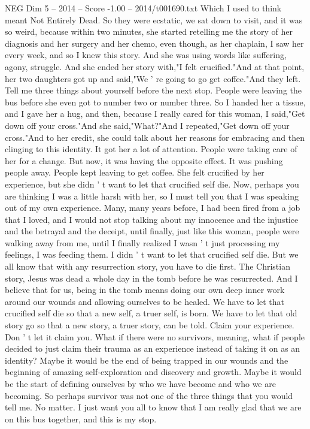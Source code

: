 \begin{textsample}{NEG Dim 5 – 2014 – Score -1.00 – 2014/t001690.txt}
Which I used to think meant Not Entirely Dead.
So they were ecstatic, we sat down to visit, and it was so weird, because within two minutes, she started retelling me the story of her diagnosis and her surgery and her chemo, even though, as her chaplain, I saw her every week, and so I knew this story.
And she was using words like suffering, agony, struggle.
And she ended her story with,"I felt crucified."And at that point, her two daughters got up and said,"We ' re going to go get coffee."And they left.
Tell me three things about yourself before the next stop.
People were leaving the bus before she even got to number two or number three.
So I handed her a tissue, and I gave her a hug, and then, because I really cared for this woman, I said,"Get down off your cross."And she said,"What?"And I repeated,"Get down off your cross."And to her credit, she could talk about her reasons for embracing and then clinging to this identity.
It got her a lot of attention.
People were taking care of her for a change.
But now, it was having the opposite effect.
It was pushing people away.
People kept leaving to get coffee.
She felt crucified by her experience, but she didn ' t want to let that crucified self die.
Now, perhaps you are thinking I was a little harsh with her, so I must tell you that I was speaking out of my own experience.
Many, many years before, I had been fired from a job that I loved, and I would not stop talking about my innocence and the injustice and the betrayal and the deceipt, until finally, just like this woman, people were walking away from me, until I finally realized I wasn ' t just processing my feelings, I was feeding them.
I didn ' t want to let that crucified self die.
But we all know that with any resurrection story, you have to die first.
The Christian story, Jesus was dead a whole day in the tomb before he was resurrected.
And I believe that for us, being in the tomb means doing our own deep inner work around our wounds and allowing ourselves to be healed.
We have to let that crucified self die so that a new self, a truer self, is born.
We have to let that old story go so that a new story, a truer story, can be told.
Claim your experience.
Don ' t let it claim you.
What if there were no survivors, meaning, what if people decided to just claim their trauma as an experience instead of taking it on as an identity?
Maybe it would be the end of being trapped in our wounds and the beginning of amazing self-exploration and discovery and growth.
Maybe it would be the start of defining ourselves by who we have become and who we are becoming.
So perhaps survivor was not one of the three things that you would tell me.
No matter.
I just want you all to know that I am really glad that we are on this bus together, and this is my stop.

\end{textsample}
